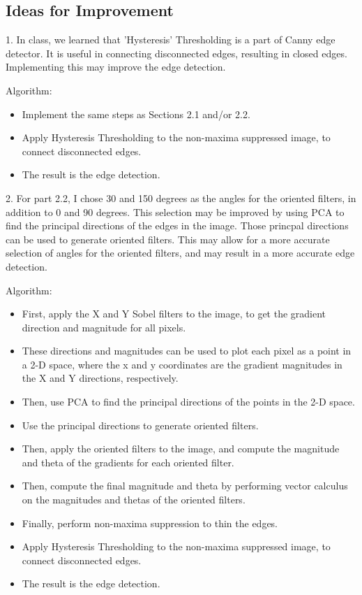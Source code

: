 \documentclass[12pt]{article}
\begin{document}
\subsection{Ideas for Improvement}
1. In class, we learned that 'Hysteresis' Thresholding is a part of Canny edge detector. It is useful in connecting disconnected edges, resulting in closed edges. Implementing this may improve the edge detection.

Algorithm:
\begin{itemize}
    \item Implement the same steps as Sections 2.1 and/or 2.2.
    \item Apply Hysteresis Thresholding to the non-maxima suppressed image, to connect disconnected edges.
    \item The result is the edge detection.
\end{itemize}

2. For part 2.2, I chose 30 and 150 degrees as the angles for the oriented filters, in addition to 0 and 90 degrees. This selection may be improved by using PCA to find the principal directions of the edges in the image. Those princpal directions can be used to generate oriented filters. This may allow for a more accurate selection of angles for the oriented filters, and may result in a more accurate edge detection.

Algorithm:
\begin{itemize}
    \item First, apply the X and Y Sobel filters to the image, to get the gradient direction and magnitude for all pixels.
    \item These directions and magnitudes can be used to plot each pixel as a point in a 2-D space, where the x and y coordinates are the gradient magnitudes in the X and Y directions, respectively.
    \item Then, use PCA to find the principal directions of the points in the 2-D space.
    \item Use the principal directions to generate oriented filters.
    \item Then, apply the oriented filters to the image, and compute the magnitude and theta of the gradients for each oriented filter.
    \item Then, compute the final magnitude and theta by performing vector calculus on the magnitudes and thetas of the oriented filters.
    \item Finally, perform non-maxima suppression to thin the edges.
    \item Apply Hysteresis Thresholding to the non-maxima suppressed image, to connect disconnected edges.
    \item The result is the edge detection.
\end{itemize}
\end{document}
